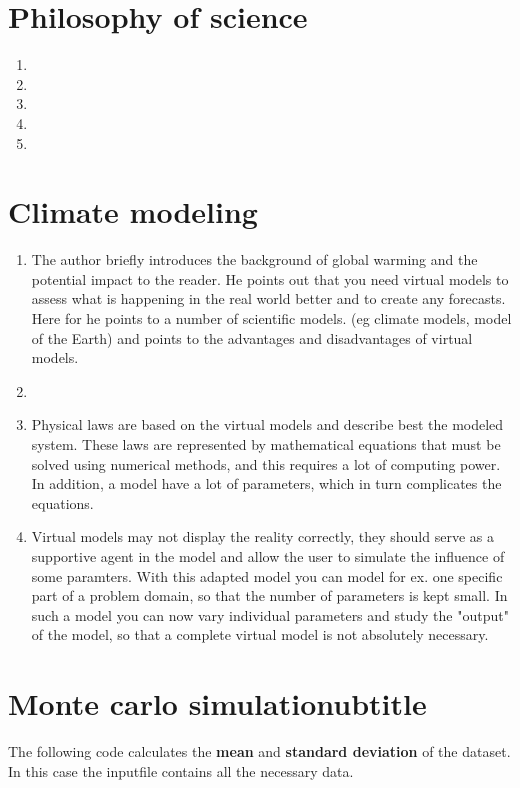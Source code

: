 \section{Philosophy of science} 
\begin{enumerate}
	\item
	\item
	\item
	\item
	\item
\end{enumerate}
\section{Climate modeling}
\begin{enumerate}
  \item The author briefly introduces the background of global warming and the potential impact to the reader.
  		He points out that you need virtual models to assess what is happening in the real world better and to 
  		create any forecasts. Here for he  points to a number of scientific models. (eg climate models, model of the Earth) 
  		and points to the advantages and disadvantages of  virtual models.
  \item 
  \item	Physical laws are based on the virtual models and describe best the modeled system. These laws are represented by mathematical equations that must be solved 
  		using numerical methods, and this requires a lot of computing power. In addition, a model have a lot of parameters, which in turn complicates the equations.
  \item Virtual  models may not display the reality correctly, they should serve as a supportive 
  		agent in the model and allow the user to simulate the influence of some paramters.
  		With this adapted model you can model for ex. one specific part of a problem domain, so that the number of parameters is kept small. 
  		In such a model  you can now vary individual parameters and study the "output" of the model, so that a complete virtual model is not absolutely necessary.
  
\end{enumerate}

\section{Monte carlo simulationubtitle}
The following code calculates the \textbf{mean}  and \textbf{standard deviation} of the dataset. 
In this case the inputfile contains all the necessary data.

